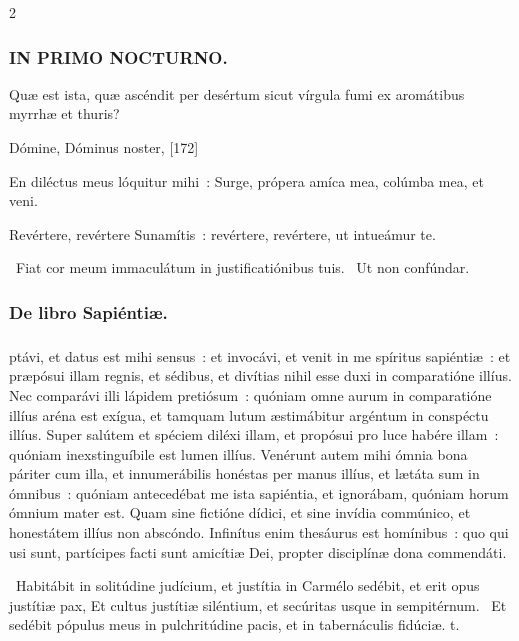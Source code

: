 \documentclass[9pt,twoside]{extarticle}
\begin{document}
\begin{multicols}{2}
{{{\subsubsection*{\center \textsc{IN PRIMO NOCTURNO.}}
\begin{tightlist}{}
\item {} Quæ est ista, quæ ascéndit per desértum sicut vírgula fumi ex aromátibus myrrhæ et thuris?
\item {} Dómine, Dóminus noster,  [172]
\item {} En diléctus meus lóquitur mihi~: Surge, própera amíca mea, colúmba mea, et veni.
\item {} Revértere, revértere Sunamítis~: revértere, revértere, ut intueámur te.
\item {}~Fiat cor meum immaculátum in justificatiónibus tuis. ~Ut non confúndar.
\item {}
\end{tightlist}

\subsubsection*{\center De libro Sapiéntiæ.}
\subsubsection*{\center {} \hfill {}}
ptávi, et datus est mihi sensus~: et invocávi, et venit in me spíritus sapiéntiæ~: et præpósui illam regnis, et sédibus, et divítias nihil esse duxi in comparatióne illíus. Nec comparávi illi lápidem pretiósum~: quóniam omne aurum in comparatióne illíus aréna est exígua, et tamquam lutum æstimábitur argéntum in conspéctu illíus. Super salútem et spéciem diléxi illam, et propósui pro luce habére illam~: quóniam inexstinguíbile est lumen illíus. Venérunt autem mihi ómnia bona páriter cum illa, et innumerábilis honéstas per manus illíus, et lætáta sum in ómnibus~: quóniam antecedébat me ista sapiéntia, et ignorábam, quóniam horum ómnium mater est. Quam sine fictióne dídici, et sine invídia commúnico, et honestátem illíus non abscóndo. Infinítus enim thesáurus est homínibus~: quo qui usi sunt, partícipes facti sunt amicítiæ Dei, propter disciplínæ dona commendáti.

\begin{tightlist}{}
\item {}~Habitábit in solitúdine judícium, et justítia in Carmélo sedébit, et erit opus justítiæ pax, \textred{*} Et cultus justítiæ siléntium, et secúritas usque in sempitérnum. ~Et sedébit pópulus meus in pulchritúdine pacis, et in tabernáculis fidúciæ. t.
\end{tightlist}

}}}
\end{multicols}
\end{document}
